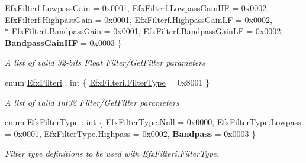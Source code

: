 \begin{DoxyCompactItemize}
\hyperlink{namespace_open_t_k_1_1_audio_1_1_open_a_l_a6a389aa5e465025fe4eb3fba1603fd6baee79638af1c097eb2fab95f6ef986169}{Efx\-Filterf.\-Lowpass\-Gain} = 0x0001, 
\hyperlink{namespace_open_t_k_1_1_audio_1_1_open_a_l_a6a389aa5e465025fe4eb3fba1603fd6ba806b196b431f2383bc9fda1c04320113}{Efx\-Filterf.\-Lowpass\-Gain\-H\-F} = 0x0002, 
\hyperlink{namespace_open_t_k_1_1_audio_1_1_open_a_l_a6a389aa5e465025fe4eb3fba1603fd6ba2032d7e8b72de38016457ffddabc88d1}{Efx\-Filterf.\-Highpass\-Gain} = 0x0001, 
\hyperlink{namespace_open_t_k_1_1_audio_1_1_open_a_l_a6a389aa5e465025fe4eb3fba1603fd6baf0acc9110423fbafc491bc87250fef41}{Efx\-Filterf.\-Highpass\-Gain\-L\-F} = 0x0002, 
\\*
\hyperlink{namespace_open_t_k_1_1_audio_1_1_open_a_l_a6a389aa5e465025fe4eb3fba1603fd6ba003dde97c99034de23ac155c216fc02d}{Efx\-Filterf.\-Bandpass\-Gain} = 0x0001, 
\hyperlink{namespace_open_t_k_1_1_audio_1_1_open_a_l_a6a389aa5e465025fe4eb3fba1603fd6ba4df107e31863711537bd32129cf084ec}{Efx\-Filterf.\-Bandpass\-Gain\-L\-F} = 0x0002, 
{\bfseries Bandpass\-Gain\-H\-F} = 0x0003
 \}
\begin{DoxyCompactList}\small\item\em A list of valid 32-\/bits Float Filter/\-Get\-Filter parameters\end{DoxyCompactList}\item 
enum \hyperlink{namespace_open_t_k_1_1_audio_1_1_open_a_l_a071c0527689a9645ced24caee8e0f542}{Efx\-Filteri} \-: int \{ \hyperlink{namespace_open_t_k_1_1_audio_1_1_open_a_l_a071c0527689a9645ced24caee8e0f542a45b6897b4ec0924a44eb7052dd5622e7}{Efx\-Filteri.\-Filter\-Type} = 0x8001
 \}
\begin{DoxyCompactList}\small\item\em A list of valid Int32 Filter/\-Get\-Filter parameters\end{DoxyCompactList}\item 
enum \hyperlink{namespace_open_t_k_1_1_audio_1_1_open_a_l_a998ad76188c9a057a6d9b4d057d08234}{Efx\-Filter\-Type} \-: int \{ \hyperlink{namespace_open_t_k_1_1_audio_1_1_open_a_l_a998ad76188c9a057a6d9b4d057d08234abbb93ef26e3c101ff11cdd21cab08a94}{Efx\-Filter\-Type.\-Null} = 0x0000, 
\hyperlink{namespace_open_t_k_1_1_audio_1_1_open_a_l_a998ad76188c9a057a6d9b4d057d08234a97ed1c13cd79855adc19c2b8a96dfa41}{Efx\-Filter\-Type.\-Lowpass} = 0x0001, 
\hyperlink{namespace_open_t_k_1_1_audio_1_1_open_a_l_a998ad76188c9a057a6d9b4d057d08234a124600c5e81d846f402aab6727296cd5}{Efx\-Filter\-Type.\-Highpass} = 0x0002, 
{\bfseries Bandpass} = 0x0003
 \}
\begin{DoxyCompactList}\small\item\em Filter type definitions to be used with Efx\-Filteri.\-Filter\-Type.\end{DoxyCompactList}\item 

\end{DoxyCompactItemize}
